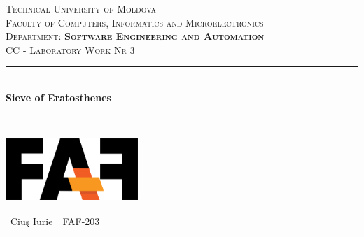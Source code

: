 \documentclass[12pt]{article}
\begin{document}
\newcommand{\HRule}{\rule{\linewidth}{0.2mm}}

\center


\textsc{
    \LARGE Technical University of Moldova
}\\[0cm]

\textsc{
    Faculty of Computers, Informatics and Microelectronics
}\\[0cm]

\textsc{
    Department: \textbf{Software Engineering and Automation}
}\\[4cm]




\textsc{
    \Large CC - Laboratory Work Nr 3
}\\[0cm]




\HRule \\[0.6cm]
{ \huge \bfseries Sieve of Eratosthenes }\\[0.1cm]
\HRule \\[1.5cm]




{\includegraphics[width=5cm]{logo.PNG}}\\[1cm]




\begin{center}
    \begin{tabular}{ c c }
        Ciuş Iurie & FAF-203
    \end{tabular}
\end{center}

\end{document}
